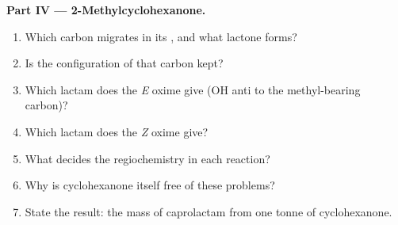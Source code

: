 \begin{problem}
\medskip\noindent\textbf{Part IV --- 2-Methylcyclohexanone.}
\begin{enumerate}[resume]
  \item Which carbon migrates in its , and what lactone forms?
  \item Is the configuration of that carbon kept?
  \item Which lactam does the \textit{E} oxime give (OH anti to the methyl-bearing carbon)?
  \item Which lactam does the \textit{Z} oxime give?
  \item What decides the regiochemistry in each reaction?
  \item Why is cyclohexanone itself free of these problems?
  \item State the result: the mass of caprolactam from one tonne of cyclohexanone.
\end{enumerate}
\end{problem}
